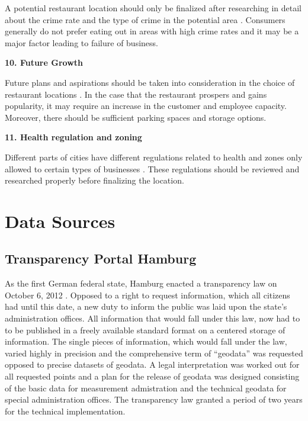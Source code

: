 \documentclass[a4paper, 11pt, oneside]{Thesis}  %
\begin{document}
A potential restaurant location should only be finalized after researching in detail about the crime rate and the type of crime in the potential area \cite{Webstaurantstore.com.25.07.2018}. Consumers generally do not prefer eating out in areas with high crime rates and it may be a major factor leading to failure of business. 

\textbf{10.	Future Growth}

Future plans and aspirations should be taken into consideration in the choice of restaurant locations \cite{Webstaurantstore.com.25.07.2018}. In the case that the restaurant prospers and gains popularity, it may require an increase in the customer and employee capacity. Moreover, there should be sufficient parking spaces and storage options.

\textbf{11.	Health regulation and zoning}

Different parts of cities have different regulations related to health and zones only allowed to certain types of businesses \cite{Webstaurantstore.com.25.07.2018}. These regulations should be reviewed and researched properly before finalizing the location. 




\chapter{Data Sources}


\section{Transparency Portal Hamburg}
As the first German federal state, Hamburg enacted a transparency law on October 6, 2012 \cite{Murjahn.2016}. Opposed to a right to request information, which all citizens had until this date, a new duty to inform the public was laid upon the state’s administration offices. All information that would fall under this law, now had to to be published in a freely available standard format on a centered storage of information. The single pieces of information, which would fall under the law, varied highly in precision and the comprehensive term of ``geodata'' was requested opposed to precise datasets of geodata. A legal interpretation was worked out for all requested points and a plan for the release of geodata was designed consisting of the basic data for measurement admistration and the technical geodata for special administration offices. The transparency law granted a period of two years for the technical implementation.
\end{document}
